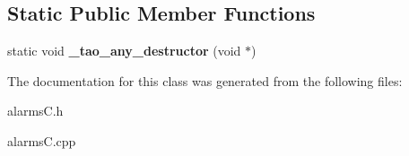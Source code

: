 \subsection*{Static Public Member Functions}
\begin{DoxyCompactItemize}
\item 
static void {\bfseries \+\_\+tao\+\_\+any\+\_\+destructor} (void $\ast$)\label{classalarms_1_1AlarmNotificationSequence_a01eb013c90aa763a664e2e2f406bf156}

\end{DoxyCompactItemize}


The documentation for this class was generated from the following files\+:\begin{DoxyCompactItemize}
\item 
alarms\+C.\+h\item 
alarms\+C.\+cpp\end{DoxyCompactItemize}
